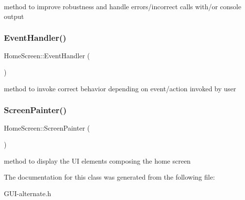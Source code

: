 method to improve robustness and handle errors/incorrect calls with/or console output \mbox{\label{class_home_screen_a4e7e2efcfd7caa30ce2098185a5e6009}} 
\subsubsection{\texorpdfstring{Event\+Handler()}{EventHandler()}}
{\footnotesize\ttfamily Home\+Screen\+::\+Event\+Handler (\begin{DoxyParamCaption}{ }\end{DoxyParamCaption})}

method to invoke correct behavior depending on event/action invoked by user \mbox{\label{class_home_screen_aab2d7fb46a2488713f38fb39a5cfc21b}} 
\subsubsection{\texorpdfstring{Screen\+Painter()}{ScreenPainter()}}
{\footnotesize\ttfamily Home\+Screen\+::\+Screen\+Painter (\begin{DoxyParamCaption}{ }\end{DoxyParamCaption})}

method to display the UI elements composing the home screen 

The documentation for this class was generated from the following file\+:\begin{DoxyCompactItemize}
\item 
G\+U\+I-\/alternate.\+h\end{DoxyCompactItemize}
